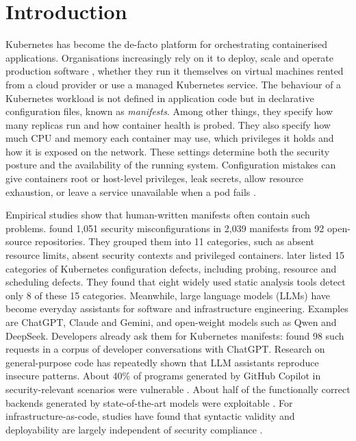 \section{Introduction}\label{sec:intro}

Kubernetes has become the de-facto platform for orchestrating containerised applications. Organisations increasingly rely on it to deploy, scale and operate production software \citep{rahman2023k8smisconfig,shamim2020xicommandments}, whether they run it themselves on virtual machines rented from a cloud provider or use a managed Kubernetes service. The behaviour of a Kubernetes workload is not defined in application code but in declarative configuration files, known as \emph{manifests}. Among other things, they specify how many replicas run and how container health is probed. They also specify how much CPU and memory each container may use, which privileges it holds and how it is exposed on the network. These settings determine both the security posture and the availability of the running system. Configuration mistakes can give containers root or host-level privileges, leak secrets, allow resource exhaustion, or leave a service unavailable when a pod fails \citep{rahman2023k8smisconfig,zhang2026k8sconfigdefects,nsacisa2022k8shardening}.

Empirical studies show that human-written manifests often contain such problems. \citet{rahman2023k8smisconfig} found 1,051 security misconfigurations in 2,039 manifests from 92 open-source repositories. They grouped them into 11 categories, such as absent resource limits, absent security contexts and privileged containers. \citet{zhang2026k8sconfigdefects} later listed 15 categories of Kubernetes configuration defects, including probing, resource and scheduling defects. They found that eight widely used static analysis tools detect only 8 of these 15 categories. Meanwhile, large language models (LLMs) have become everyday assistants for software and infrastructure engineering. Examples are ChatGPT, Claude and Gemini, and open-weight models such as Qwen and DeepSeek. Developers already ask them for Kubernetes manifests: \citet{zhang2024genaismells} found 98 such requests in a corpus of developer conversations with ChatGPT. Research on general-purpose code has repeatedly shown that LLM assistants reproduce insecure patterns. About 40\% of programs generated by GitHub Copilot in security-relevant scenarios were vulnerable \citep{pearce2022asleep}. About half of the functionally correct backends generated by state-of-the-art models were exploitable \citep{vero2025baxbench}. For infrastructure-as-code, studies have found that syntactic validity and deployability are largely independent of security compliance \citep{santosvargas2026secureterraform,zhang2026iacgen}.

